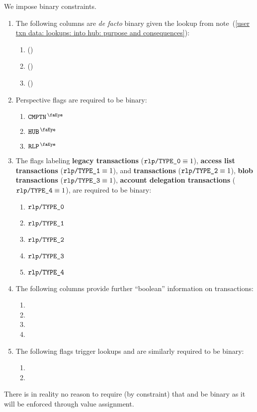 We impose binary constraints.
\begin{enumerate}
	\item
		The following columns are \emph{de facto} binary given the lookup from
		note~(\ref{user txn data: lookups: into hub: purpose and consequences}):
		\begin{enumerate}
			\item \sysi{} \quad (\sanityCheck)
			\item \user{} \quad (\sanityCheck)
			\item \sysf{} \quad (\sanityCheck)
		\end{enumerate}
	\item
		Perspective flags are required to be binary:
		\begin{enumerate}
			\item $\isUserTxnComputation$
			\item $\isUserTxnHubView$
			\item $\isUserTxnRlpView$
		\end{enumerate}
	\item
		The flags labeling
		\textbf{legacy transactions}             ($\texttt{rlp} \texttt{/}{\texttt{\texttt{TYPE\_0}}}            \equiv 1$),
		\textbf{access list transactions}        ($\texttt{rlp} \texttt{/}{\texttt{\texttt{TYPE\_1}}}         \equiv 1$), and
		\textbf{\cite{EIP-1559} transactions}    ($\texttt{rlp} \texttt{/}{\texttt{\texttt{TYPE\_2}}}           \equiv 1$),
		\textbf{blob transactions}               ($\texttt{rlp} \texttt{/}{\texttt{\texttt{TYPE\_3}}}              \equiv 1$),
		\textbf{account delegation transactions} ($\texttt{rlp} \texttt{/}{\texttt{\texttt{TYPE\_4}}} \equiv 1$),
		are required to be binary:
		\begin{enumerate}
			\item $\texttt{rlp} \texttt{/}{\texttt{\texttt{TYPE\_0}}}            $
			\item $\texttt{rlp} \texttt{/}{\texttt{\texttt{TYPE\_1}}}         $
			\item $\texttt{rlp} \texttt{/}{\texttt{\texttt{TYPE\_2}}}           $
			\item $\texttt{rlp} \texttt{/}{\texttt{\texttt{TYPE\_3}}}              $
			\item $\texttt{rlp} \texttt{/}{\texttt{\texttt{TYPE\_4}}} $
		\end{enumerate}
	\item
		The following columns provide further ``boolean'' information on transactions:
		\begin{enumerate}
			\item \txIsDeployment{}
			\item \txStatusCode{}
			\item \txCopyTxcd{}
			\item \txRequiresEvmExecution{}
		\end{enumerate}
	\item
		The following flags trigger lookups and are similarly required to be binary:
		\begin{enumerate}
			\item \eucFlag{}
			\item \wcpFlag{}
		\end{enumerate}
\end{enumerate}
\saNote{}
There is in reality no reason to require (by constraint) that \txCopyTxcd{} and \isLastTxOfBlock{} be binary as it will be enforced through value assignment.
